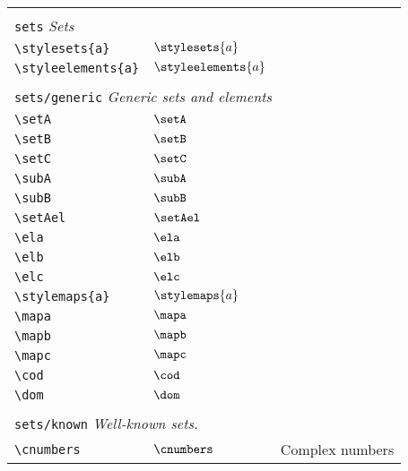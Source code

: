 \begin{longtable}{lll}
 &  & \\ 
 \multicolumn{3}{l}{{\color[rgb]{0.5,0.5,0.5}\texttt{sets}} \emph{Sets}}\\ 
 \hline
\hline
{\color[rgb]{0.5,0.5,0.5}\texttt{\textbackslash stylesets\{a\}}} & $\stylesets{a}$ & \\ 
 {\color[rgb]{0.5,0.5,0.5}\texttt{\textbackslash styleelements\{a\}}} & $\styleelements{a}$ & \\ 
  &  & \\ 
 \multicolumn{3}{l}{{\color[rgb]{0.5,0.5,0.5}\texttt{sets/generic}} \emph{Generic sets and elements}}\\ 
 \hline
{\color[rgb]{0.5,0.5,0.5}\texttt{\textbackslash setA}} & $\setA$ & \\ 
 {\color[rgb]{0.5,0.5,0.5}\texttt{\textbackslash setB}} & $\setB$ & \\ 
 {\color[rgb]{0.5,0.5,0.5}\texttt{\textbackslash setC}} & $\setC$ & \\ 
 {\color[rgb]{0.5,0.5,0.5}\texttt{\textbackslash subA}} & $\subA$ & \\ 
 {\color[rgb]{0.5,0.5,0.5}\texttt{\textbackslash subB}} & $\subB$ & \\ 
 {\color[rgb]{0.5,0.5,0.5}\texttt{\textbackslash setAel}} & $\setAel$ & \\ 
 {\color[rgb]{0.5,0.5,0.5}\texttt{\textbackslash ela}} & $\ela$ & \\ 
 {\color[rgb]{0.5,0.5,0.5}\texttt{\textbackslash elb}} & $\elb$ & \\ 
 {\color[rgb]{0.5,0.5,0.5}\texttt{\textbackslash elc}} & $\elc$ & \\ 
 {\color[rgb]{0.5,0.5,0.5}\texttt{\textbackslash stylemaps\{a\}}} & $\stylemaps{a}$ & \\ 
 {\color[rgb]{0.5,0.5,0.5}\texttt{\textbackslash mapa}} & $\mapa$ & \\ 
 {\color[rgb]{0.5,0.5,0.5}\texttt{\textbackslash mapb}} & $\mapb$ & \\ 
 {\color[rgb]{0.5,0.5,0.5}\texttt{\textbackslash mapc}} & $\mapc$ & \\ 
 {\color[rgb]{0.5,0.5,0.5}\texttt{\textbackslash cod}} & $\cod$ & \\ 
 {\color[rgb]{0.5,0.5,0.5}\texttt{\textbackslash dom}} & $\dom$ & \\ 
  &  & \\ 
 \multicolumn{3}{l}{{\color[rgb]{0.5,0.5,0.5}\texttt{sets/known}} \emph{Well-known sets.}}\\ 
 \hline
{\color[rgb]{0.5,0.5,0.5}\texttt{\textbackslash cnumbers}} & $\cnumbers$ &  Complex numbers\\ 

\end{longtable}
